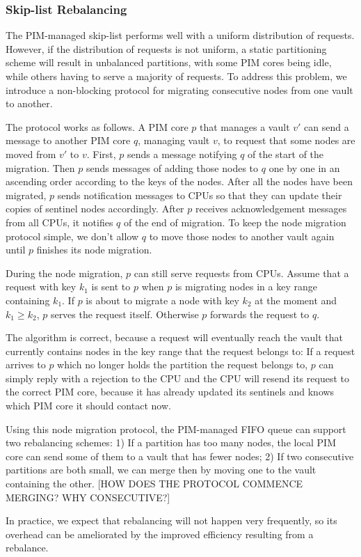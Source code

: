 \subsubsection{Skip-list Rebalancing}
The PIM-managed skip-list performs well with a uniform distribution of requests.
However, if the distribution of requests is not uniform, a static partitioning scheme 
will result in unbalanced partitions, with some PIM cores being idle, while others having to 
serve a majority of requests. To address this problem, we introduce a non-blocking protocol for 
migrating consecutive nodes from one vault to another. 

The protocol works as follows. 
A PIM core $p$ that manages a vault $v'$ can send a message to another PIM core $q$, managing vault 
$v$, to request that some nodes are moved from $v'$ to $v$. 
First, $p$ sends a message notifying $q$ of the start of the migration. 
Then $p$ sends messages of adding those nodes to $q$ one by one in an ascending order 
according to the keys of the nodes. 
After all the nodes have been migrated, $p$ sends notification messages to CPUs so that 
they can update their copies of sentinel nodes accordingly.
After $p$ receives acknowledgement messages from all CPUs, it notifies $q$ of the end of migration.
To keep the node migration protocol simple, we don't allow $q$ to move those nodes 
to another vault again until $p$ finishes its node migration. 

During the node migration, $p$ can still serve requests from CPUs.
Assume that a request with key $k_1$ is sent to $p$ when $p$ is migrating nodes 
in a key range containing $k_1$.  
If $p$ is about to migrate a node with key $k_2$ at the moment and $k_1 \ge k_2$, 
$p$ serves the request itself. 
Otherwise $p$ forwards the request to $q$. 

The algorithm is correct, because 
a request will eventually reach the vault that 
currently contains nodes in the key range that the request belongs to: 
If a request arrives to $p$ which no longer holds the partition the request belongs to, 
$p$ can simply reply with a rejection to the CPU and the CPU will resend its request to 
the correct PIM core, 
because it has already updated its sentinels and knows which PIM core it should contact now. 

Using this node migration protocol, the PIM-managed FIFO queue can support two rebalancing schemes:
1) If a partition has too many nodes, the local PIM core can send some of them to a vault that has 
fewer nodes;
2) If two consecutive partitions are both small, 
we can merge then by moving one to the vault containing the other. 
[HOW DOES THE PROTOCOL COMMENCE MERGING? WHY CONSECUTIVE?]

In practice, we expect that rebalancing will not happen very frequently, so its overhead can be 
ameliorated by the improved efficiency resulting from a rebalance. 

